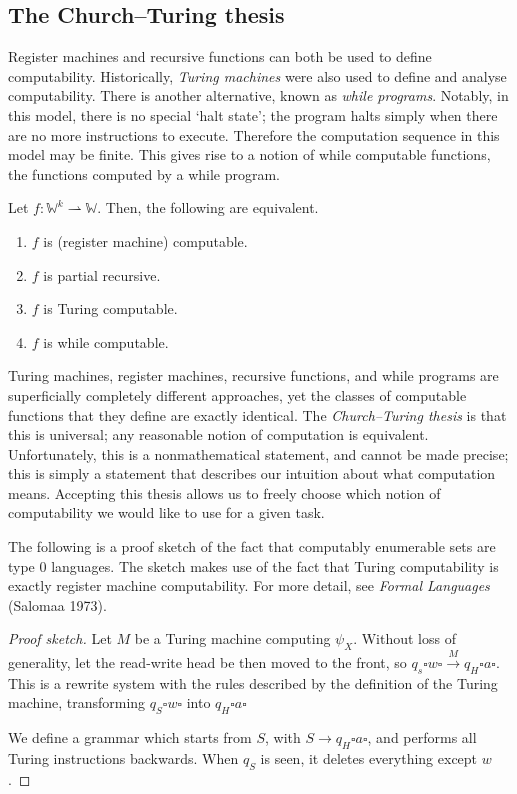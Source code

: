 \subsection{The Church--Turing thesis}
Register machines and recursive functions can both be used to define computability.
Historically, \emph{Turing machines} were also used to define and analyse computability.
There is another alternative, known as \emph{while programs}.
Notably, in this model, there is no special `halt state'; the program halts simply when there are no more instructions to execute.
Therefore the computation sequence in this model may be finite.
This gives rise to a notion of while computable functions, the functions computed by a while program.

\begin{theorem}
	Let \( f \colon \mathbb W^k \rightharpoonup \mathbb W \).
	Then, the following are equivalent.
	\begin{enumerate}
		\item \( f \) is (register machine) computable.
		\item \( f \) is partial recursive.
		\item \( f \) is Turing computable.
		\item \( f \) is while computable.
	\end{enumerate}
\end{theorem}
Turing machines, register machines, recursive functions, and while programs are superficially completely different approaches, yet the classes of computable functions that they define are exactly identical.
The \emph{Church--Turing thesis} is that this is universal; any reasonable notion of computation is equivalent.
Unfortunately, this is a nonmathematical statement, and cannot be made precise; this is simply a statement that describes our intuition about what computation means.
Accepting this thesis allows us to freely choose which notion of computability we would like to use for a given task.

The following is a proof sketch of the fact that computably enumerable sets are type 0 languages.
The sketch makes use of the fact that Turing computability is exactly register machine computability.
For more detail, see \emph{Formal Languages} (Salomaa 1973).
\begin{proof}[Proof sketch]
	Let \( M \) be a Turing machine computing \( \psi_X \).
	Without loss of generality, let the read-write head be then moved to the front, so \( q_s \square w \square \xrightarrow M q_H \square a \square \).
	This is a rewrite system with the rules described by the definition of the Turing machine, transforming \( q_S \square w \square \) into \( q_H \square a \square \)

	We define a grammar which starts from \( S \), with \( S \to q_H \square a \square \), and performs all Turing instructions backwards.
	When \( q_S \) is seen, it deletes everything except \( w \).
\end{proof}

